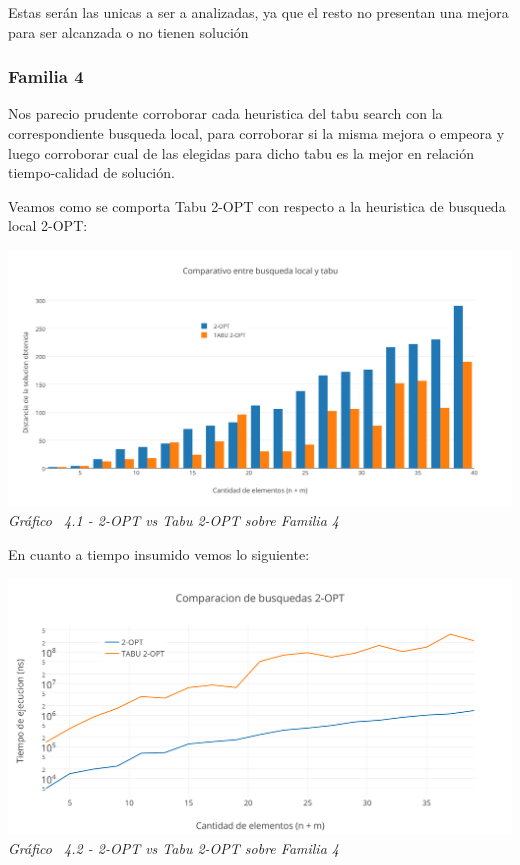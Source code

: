 Estas ser\'an las unicas a ser a analizadas, ya que el resto no presentan una mejora para ser alcanzada o no tienen soluci\'on
 

\subsubsection*{Familia 4}

Nos parecio prudente corroborar cada heuristica del tabu search con la correspondiente busqueda local, para corroborar si la misma mejora o empeora y luego corroborar cual de las elegidas para dicho tabu es la mejor en relaci\'on tiempo-calidad de soluci\'on.

Veamos como se comporta Tabu 2-OPT con respecto a la heuristica de busqueda local 2-OPT:

\vspace*{0.3cm} \vspace*{0.3cm}
  \begin{center}
 \includegraphics[scale=0.5]{./EJ4/comparativogym02opt.png}\\
 {            \textit{Gráfico \ 4.1 - 2-OPT vs Tabu 2-OPT sobre Familia 4}}
  \end{center}
  \vspace*{0.3cm}

En cuanto a tiempo insumido vemos lo siguiente:

\vspace*{0.3cm} \vspace*{0.3cm}
  \begin{center}
 \includegraphics[scale=0.5]{./EJ4/medicion2optgym0.png}\\
 {            \textit{Gráfico \ 4.2 - 2-OPT vs Tabu 2-OPT sobre Familia 4}}
  \end{center}
  \vspace*{0.3cm}


